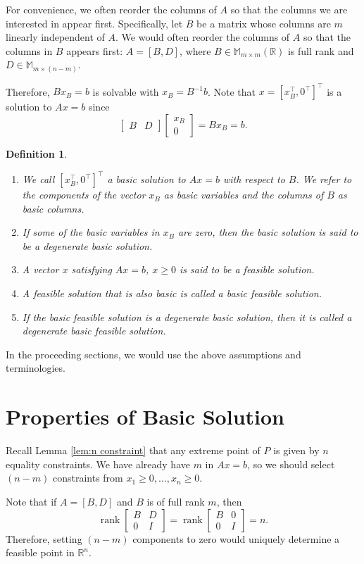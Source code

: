 \documentclass[12pt,a4paper]{report}
\numberwithin{equation}{section}
\theoremstyle{mystyle}
\newtheorem{definition}{Definition}[section]
\newcommand{\R}{\mathbb{R}}
\newcommand{\T}{\top}
\newcommand{\rank}{\operatorname{rank}}
\begin{document}
	For convenience, we often reorder the columns of $A$ so that the columns we are interested in appear first. Specifically, let $B$ be a matrix whose columns are $m$ linearly independent of $A$. We would often reorder the columns of $A$ so that the columns in $B$ appears first: $A=[B,D]$, where $B\in \mathbb{M}_{m\times m}(\R)$ is full rank and $D\in \mathbb{M}_{m\times (n-m)}$. 
	
	Therefore, $Bx_B=b$ is solvable with $x_B=B^{-1}b$. Note that $x=[x_B^\T,0^\T]^\T$ is a solution to $Ax=b$ since 
	$$
	\begin{bmatrix}
		B & D
	\end{bmatrix}
	\begin{bmatrix}
		x_B\\
		0
	\end{bmatrix}
	=B x_B=b.
	$$
	\begin{definition}
		\begin{enumerate}
			\item We call $[x_B^\T,0^\T]^\T$ a \emph{basic solution} to $Ax=b$ with respect to $B$. We refer to the components of the vector $x_B$ as \emph{basic variables} and the columns of $B$ as basic columns.
			\item If some of the basic variables in $x_B$ are zero, then the basic solution is said to be a \emph{degenerate basic solution}.
			\item A vector $x$ satisfying $Ax=b$, $x\geq 0$ is said to be a \emph{feasible solution}.
			\item A feasible solution that is also basic is called a \emph{basic feasible solution}.
			\item If the basic feasible solution is a degenerate basic solution, then it is called a \emph{degenerate basic feasible solution}.
		\end{enumerate}
	\end{definition}
	
	In the proceeding sections, we would use the above assumptions and terminologies.
	
	\section{Properties of Basic Solution}
	Recall Lemma \ref{lem:n constraint} that any extreme point of $P$ is given by $n$ equality constraints. We have already have $m$ in $Ax=b$, so we should select $(n-m)$ constraints from $x_1\geq0,\dots,x_n\geq 0$.
	
	Note that if $A=[B,D]$ and $B$ is of full rank $m$, then 
	$$
	\rank \begin{bmatrix}
		B & D\\
		0 & I
	\end{bmatrix}
	=\rank \begin{bmatrix}
		B & 0\\
		0 & I
	\end{bmatrix}=n.
	$$
	Therefore, setting $(n-m)$ components to zero would uniquely determine a feasible point in $\R^n$.
	
\end{document}

